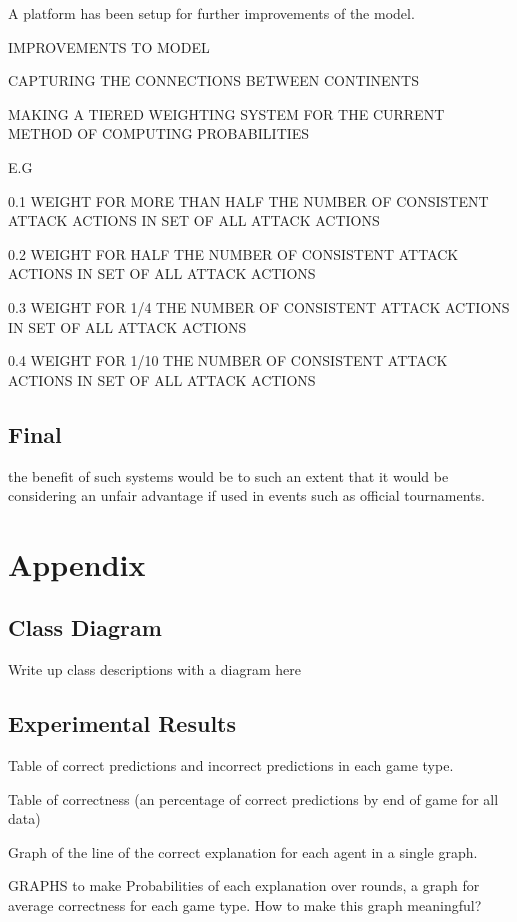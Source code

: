 \documentclass[parskip]{cs4rep}
\begin{document}
A platform has been setup for further improvements of the model.

IMPROVEMENTS TO MODEL

CAPTURING THE CONNECTIONS BETWEEN CONTINENTS

MAKING A TIERED WEIGHTING SYSTEM FOR THE CURRENT METHOD OF COMPUTING PROBABILITIES

E.G 

0.1 WEIGHT FOR MORE THAN HALF THE NUMBER OF CONSISTENT ATTACK ACTIONS IN SET OF ALL ATTACK ACTIONS

0.2 WEIGHT FOR HALF THE NUMBER OF CONSISTENT ATTACK ACTIONS IN SET OF ALL ATTACK ACTIONS

0.3 WEIGHT FOR 1/4 THE NUMBER OF CONSISTENT ATTACK ACTIONS IN SET OF ALL ATTACK ACTIONS

0.4 WEIGHT FOR 1/10 THE NUMBER OF CONSISTENT ATTACK ACTIONS IN SET OF ALL ATTACK ACTIONS

\section{Final}

the benefit of such systems would be to such an extent that it would be considering an unfair advantage if used in events such as official tournaments.

\chapter{Appendix}

\section{Class Diagram}

Write up class descriptions with a diagram here

\section{Experimental Results}

Table of correct predictions and incorrect predictions in each game type.

Table of correctness (an percentage of correct predictions by end of game for all data)

Graph of the line of the correct explanation for each agent in a single graph.

GRAPHS to make
Probabilities of each explanation over rounds, a graph for average correctness for each game type.
How to make this graph meaningful?



\end{document}
